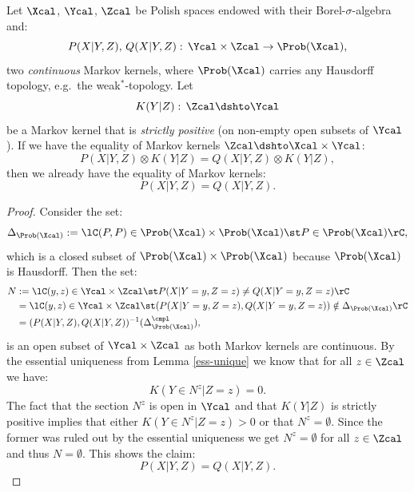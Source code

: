  \begin{Lem}
    \label{lem:cont-cond-unique}
    Let $\Xcal$, $\Ycal$, $\Zcal$ be Polish spaces endowed with their Borel-$\sigma$-algebra and:
    \[P(X|Y,Z),\,Q(X|Y,Z):\, \Ycal\times \Zcal \to \Prob(\Xcal),\]
    two \emph{continuous} Markov kernels, where $\Prob(\Xcal)$ carries any Hausdorff topology, e.g.\ the weak$^*$-topology.
    Let  \[K(Y|Z):\,\Zcal \dshto \Ycal\]
    be a Markov kernel that is \emph{strictly positive} (on non-empty open subsets of $\Ycal$).
    If we have the equality of Markov kernels $\Zcal \dshto \Xcal \times \Ycal$:
    \[ P(X|Y,Z) \otimes K(Y|Z) = Q(X|Y,Z) \otimes K(Y|Z), \]
    then we already have the equality of Markov kernels:
    \[ P(X|Y,Z)  = Q(X|Y,Z). \]
    \begin{proof}
      Consider the set:
      \[ \Delta_{\Prob(\Xcal)} := \lC (P,P) \in \Prob(\Xcal) \times \Prob(\Xcal) \st P \in \Prob(\Xcal) \rC, \]
      which is a closed subset of $\Prob(\Xcal)\times \Prob(\Xcal)$ because $\Prob(\Xcal)$ is Hausdorff.
     Then the set:
        \begin{align*}
          N &:= \lC (y,z) \in \Ycal \times \Zcal \st P(X|Y=y,Z=z)  \neq Q(X|Y=y,Z=z) \rC \\
            &= \lC (y,z) \in \Ycal \times \Zcal \st (P(X|Y=y,Z=z),Q(X|Y=y,Z=z)) \notin \Delta_{\Prob(\Xcal)} \rC \\
            &=(P(X|Y,Z), Q(X|Y,Z))^{-1}(\Delta_{\Prob(\Xcal)}^\cmpl), 
        \end{align*}
        is an open subset of $\Ycal \times \Zcal$ as both Markov kernels are continuous.
        By the essential uniqueness from Lemma \ref{ess-unique} we know that for all $z \in \Zcal$ we have:
        \[ K(Y \in N^z|Z=z) =0.  \]
        The fact that the section $N^z$ is open in $\Ycal$ and that $K(Y|Z)$ is strictly positive 
        implies that either $K(Y \in N^z|Z=z) >0$ or that $N^z=\emptyset$.
        Since the former was ruled out by the essential uniqueness we get $N^z=\emptyset$ for all $z \in \Zcal$ and thus $N=\emptyset$.
        This shows the claim:
    \[ P(X|Y,Z)  = Q(X|Y,Z). \]
    \end{proof}
\end{Lem}




